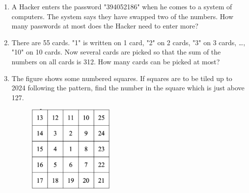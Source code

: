 \documentclass[11pt]{scrartcl}
\begin{document}
\begin{enumerate}
     \item A Hacker enters the password "394052186" when he comes to a system of computers. The system says they have swapped two of the numbers. How many passwords at most does the Hacker need to enter more?

     \item There are 55 cards. "1" is written on 1 card, "2" on 2 cards, "3" on 3 cards, \ldots, "10" on 10 cards. Now several cards are picked so that the sum of the numbers on all cards is 312. How many cards can be picked at most?
    
    \item The figure shows some numbered squares. If squares are to be tiled up to 2024 following the pattern, find the number in the square which is just above 127. 
    \begin{figure}[h]
        \centering
        \includegraphics[width=0.4\textwidth]{StarGen/0Figure/square-siput.png}
    \end{figure}
\end{enumerate}
\end{document}
